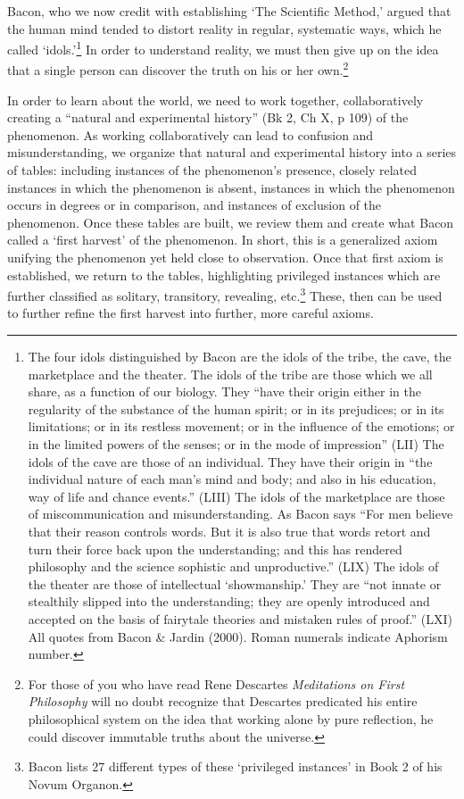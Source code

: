 Bacon, who we now credit with establishing `The Scientific Method,' argued that the human mind tended to distort reality in regular, systematic ways, which he called `idols.'\footnote{The four idols distinguished by Bacon are the idols of the tribe, the cave, the marketplace and the theater. The idols of the tribe are those which we all share, as a function of our biology. They ``have their origin either in the regularity of the substance of the human spirit; or in its prejudices; or in its limitations; or in its restless movement; or in the influence of the emotions; or in the limited powers of the senses; or in the mode of impression'' (LII)
The idols of the cave are those of an individual. They have their origin in ``the individual nature of each man's mind and body; and also in his education, way of life and chance events.'' (LIII)
The idols of the marketplace are those of miscommunication and misunderstanding. As Bacon says ``For men believe that their reason controls words. But it is also true that words retort and turn their force back upon the understanding; and this has rendered philosophy and the science sophistic and unproductive.'' (LIX)
The idols of the theater are those of intellectual `showmanship.' They are ``not innate or stealthily slipped into the understanding; they are openly introduced and accepted on the basis of fairytale theories and mistaken rules of proof.'' (LXI)
All quotes from Bacon \& Jardin (2000). Roman numerals indicate Aphorism number.} In order to understand reality, we must then give up on the idea that a single person can discover the truth on his or her own.\footnote{For those of you who have read Rene Descartes \emph{Meditations on First Philosophy} will no doubt recognize that Descartes predicated his entire philosophical system on the idea that working alone by pure reflection, he could discover immutable truths about the universe.}

In order to learn about the world, we need to work together, collaboratively creating a ``natural and experimental history'' (Bk 2, Ch X, p 109) of the phenomenon. As working collaboratively can lead to confusion and misunderstanding, we organize that natural and experimental history into a series of tables: including instances of the phenomenon's presence, closely related instances in which the phenomenon is absent, instances in which the phenomenon occurs in degrees or in comparison, and instances of exclusion of the phenomenon. Once these tables are built, we review them and create what Bacon called a `first harvest' of the phenomenon. In short, this is a generalized axiom unifying the phenomenon yet held close to observation. Once that first axiom is established, we return to the tables, highlighting privileged instances which are further classified as solitary, transitory, revealing, etc.\footnote{Bacon lists 27 different types of these `privileged instances' in Book 2 of his Novum Organon.} These, then can be used to further refine the first harvest into further, more careful axioms.


